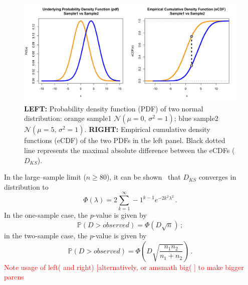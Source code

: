 \documentclass[codesnippet]{jss}
\newcommand{\RBnote}[1]{\textcolor{red}{#1}}
\begin{document}
\begin{figure}[t!]
\centering
\includegraphics{pdfvsCDF}
\caption{\label{fig:kstest1D} \textbf{LEFT:} Probability density function (PDF) of two normal distribution: orange sample1 $\mathcal{N}(\mu = 0,\,\sigma^{2} = 1)$; blue sample2 $\mathcal{N}(\mu = 5,\,\sigma^{2} = 1)$. \textbf{RIGHT:} Empirical cumulative density functions (eCDF) of the two PDFs in the left panel. Black dotted line represents the maximal absolute difference between the eCDFs ($D_{KS}$).
}
\end{figure}


In the large--sample limit ($n \geq 80$), it can be shown~\citep{Kendall1946} that $D_{KS}$ converges in distribution to 
\begin{equation} \label{eq:1}
\Phi(\lambda) = 2 \sum_{k=1}^{\infty} -1^{k-1}e^{-2k^2\lambda^2} \,.
\end{equation}
%
In the one-sample case, the $p$-value is given by 
\begin{equation} \label{eq:2}
\mathbb{P}(D > observed) = \Phi ( D\sqrt{n})\,;
\end{equation}
in the two-sample case, the $p$-value is given by
%
\begin{equation} \label{eq:3}
\mathbb{P}(D > observed) = \Phi \left( D\sqrt{\frac{n_1n_2}{n_1+n_2}} \right)\,.
\end{equation}
%
\RBnote{Note usage of left( and right) [alternatively, or amsmath big( ] to make bigger parens}
\end{document}
